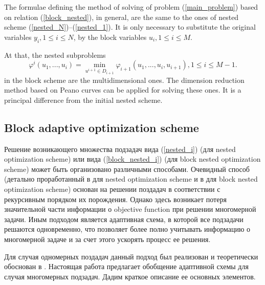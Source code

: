 \documentclass[runningheads]{llncs}
\begin{document}
The formulae defining the method of solving of problem (\ref{main_problem}) 
based on relation (\ref{block_nested}), in general, are the same to the ones 
of nested scheme (\ref{nested_N})--(\ref{nested_1}). It is only necessary to 
substitute the original variables $y_i, 1\leq i \leq N$,  by the block 
variables $u_i, 1\leq i \leq M$. 

At that, the nested subproblems 
\begin{equation}\label{block_nested_i}
\varphi^i(u_1,...,u_i) = \min_{u^{i+1}\in D_{i+1}} \varphi_{i+1}(u_1,...,u_i,u
_{i+1}), 1\leq i\leq M-1.
\end{equation}
in the block scheme are the multidimensional ones. The dimension reduction 
method based on Peano curves can be applied for solving these ones. It is a 
principal difference from the initial nested scheme. 

\subsection{Block adaptive optimization scheme}

\Russian
Решение возникающего множества подзадач вида (\ref{nested_i}) (для nested optimization scheme) или вида (\ref{block_nested_i}) (для block nested optimization scheme) может быть организовано различными способами. 
Очевидный способ (детально проработанный в \cite{Grishagin2001,Grishagin2015} для nested optimization scheme и в \cite{Barkalov2014,Barkalov2016} для block nested optimization scheme) основан на решении поздадач в соответствии с рекурсивным порядком их порождения. Однако здесь возникает потеря значительной части информации о objective function при решении многомерной задачи. Иным  подходом является адаптивная схема, в которой все подзадачи решаются одновременно, что позволяет более полно учитывать информацию о многомерной задаче и за счет этого ускорять процесс ее решения.

Для случая одномерных поздадач данный подход был реализован и теоретически обоснован в \cite{Grishagin2016,Grishagin2016_1,Grishagin2018}. Настоящая работа предлагает обобщение адаптивной схемы для случая многомерных подзадач.
Дадим краткое описание ее основных элементов.
\end{document}
